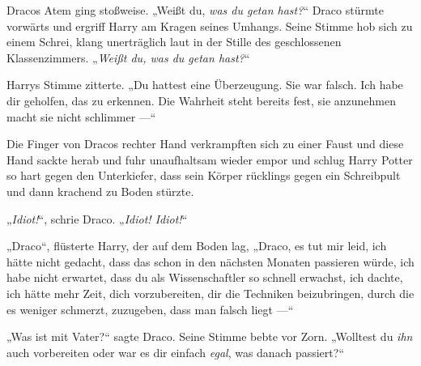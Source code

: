 Dracos Atem ging stoßweise.
„Weißt du, \emph{was du getan hast?}“ Draco stürmte vorwärts und ergriff Harry am Kragen seines Umhangs. Seine Stimme hob sich zu einem Schrei, klang unerträglich laut in der Stille des geschlossenen Klassenzimmers.
„\emph{Weißt du, was du getan hast?}“

Harrys Stimme zitterte.
„Du hattest eine Überzeugung. Sie war falsch. Ich habe dir geholfen, das zu erkennen. Die Wahrheit steht bereits fest, sie anzunehmen macht sie nicht schlimmer —“

Die Finger von Dracos rechter Hand verkrampften sich zu einer Faust und diese Hand sackte herab und fuhr unaufhaltsam wieder empor und schlug Harry Potter so hart gegen den Unterkiefer, dass sein Körper rücklings gegen ein Schreibpult und dann krachend zu Boden stürzte.

„\emph{Idiot!}“, schrie Draco.
„\emph{Idiot! Idiot!}“

„Draco“, flüsterte Harry, der auf dem Boden lag,
„Draco, es tut mir leid, ich hätte nicht gedacht, dass das schon in den nächsten Monaten passieren würde, ich habe nicht erwartet, dass du als Wissenschaftler so schnell erwachst, ich dachte, ich hätte mehr Zeit, dich vorzubereiten, dir die Techniken beizubringen, durch die es weniger schmerzt, zuzugeben, dass man falsch liegt —“

„Was ist mit Vater?“ sagte Draco. Seine Stimme bebte vor Zorn.
„Wolltest du \emph{ihn} auch vorbereiten oder war es dir einfach \emph{egal}, was danach passiert?“

